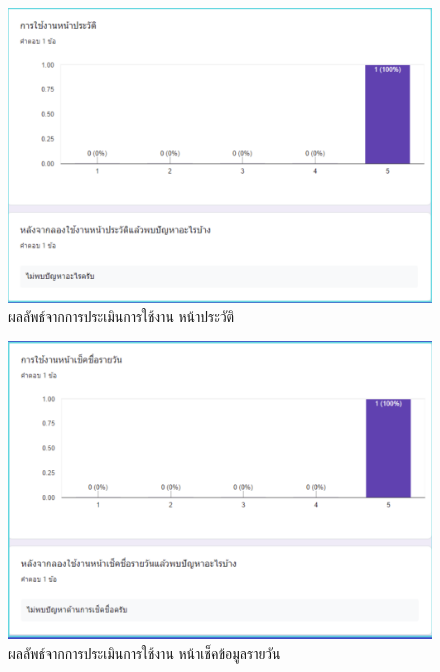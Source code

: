 \begin{figure}
  \begin{center}
    \includegraphics[width=\linewidth]{images/eval2.png}
  \end{center}
  \caption[ผลลัพธ์จากการประเมินการใช้งาน หน้าประวัติ]{ผลลัพธ์จากการประเมินการใช้งาน หน้าประวัติ}
  \label{fig:Eval2}
\end{figure}

\begin{figure}
  \begin{center}
    \includegraphics[width=\linewidth]{images/eval3.png}
  \end{center}
  \caption[ผลลัพธ์จากการประเมินการใช้งาน หน้าประวัติ]{ผลลัพธ์จากการประเมินการใช้งาน หน้าเช็คข้อมูลรายวัน}
  \label{fig:Eval3}
\end{figure}

